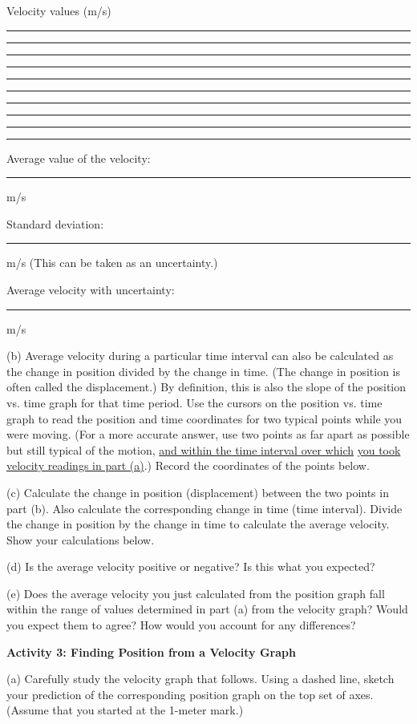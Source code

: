 Velocity values (m/s) \rule{0.5in}{0.1pt} \rule{0.5in}{0.1pt} \rule{0.5in}{0.1pt} \rule{0.5in}{0.1pt} \rule{0.5in}{0.1pt} \rule{0.5in}{0.1pt} \rule{0.5in}{0.1pt} \rule{0.5in}{0.1pt} \rule{0.5in}{0.1pt} \rule{0.5in}{0.1pt}
\vspace{5mm}

Average value of the velocity: \rule{1.0in}{0.1pt} m/s

Standard deviation: \rule{1.0in}{0.1pt} m/s     (This can be taken as an uncertainty.)

Average velocity with uncertainty: \rule{1.5in}{0.1pt} m/s
\vspace{10mm}

(b) Average velocity during a particular time interval can also be calculated
as the change in position divided by the change in time. (The change in position
is often called the displacement.) By definition, this is also the slope of
the position vs. time graph for that time period. Use the cursors on the position
vs. time graph to read the position and time coordinates for two typical points
while you were moving. (For a more accurate answer, use two points as far apart
as possible but still typical of the motion, \underline{and within the time 
interval over which} \underline{you took velocity readings in part (a)}.) 
Record the coordinates of the points below.
\vspace{10mm}

(c) Calculate the change in position (displacement) between the two points in
part (b). Also calculate the corresponding change in time (time interval). Divide the change in position by the change in time to calculate the average velocity.  Show your calculations below.
\vspace{20mm}

(d) Is the average velocity positive or negative? Is this what you expected? 
\vspace{20mm}

(e) Does the average velocity you just calculated from the position graph fall within the range of values determined in part (a) from the velocity graph? Would you expect them to agree? How would you account for any differences?
\vspace{20mm}

\textbf{Activity 3: Finding Position from a Velocity Graph }

(a) Carefully study the velocity graph that follows. Using a dashed line, sketch your prediction of the corresponding position graph on the top set of axes.
(Assume that you started at the 1-meter mark.)

